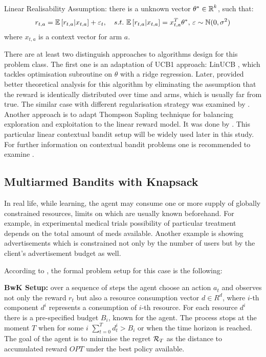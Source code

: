   \begin{definition}
      Linear Realisability Assumption: there is a unknown vector $\theta^* \in \operatorname{\mathbb{R}}^k$, such that: 
        \begin{equation*}
                r_{t,a} = \operatorname{\mathbb{E}}\left[r_{t,a}|x_{t,a}\right] + \varepsilon_t, \quad s.t. \,\operatorname{\mathbb{E}}\left[r_{t,a}|x_{t,a}\right] = x_{t,a}^T\theta^*,\, \varepsilon \sim \operatorname{\mathbb{N}}(0, \sigma^2)
        \end{equation*}  
        where $x_{t,a}$ is a context vector for arm $a$.
  \end{definition}
  There are at least two distinguish approaches to algorithms design for this problem class. The first one is an adaptation of UCB1 approach: LinUCB \cite{Li2010}, which tackles optimisation subroutine on $\theta$ with a ridge regression. Later, \cite{Abbasi-Yadkori2011} provided better theoretical analysis for this algorithm by eliminating the assumption that the reward is identically distributed over time and arms, which is usually far from true. The similar case with different regularisation strategy was examined by \cite{Auer2003}. Another approach is to adapt Thompson Sapling technique \cite{Li2011} for balancing exploration and exploitation to the linear reward model. It was done by \cite{Agrawal2013}. This particular linear contextual bandit setup will be widely used later in this study. For further information on contextual bandit problems one is recommended to examine \cite{Zhou2015}.
  
  \subsection{Multiarmed Bandits with Knapsack}
  In real life, while learning, the agent may consume one or more supply of globally constrained resources, limits on which are usually known beforehand. For example, in experimental medical trials possibility of particular treatment depends on the total amount of meds available. Another example is showing advertisements which is constrained not only by the number of users but by the client's advertisement budget as well. 
  
  According to \cite{Badanidiyuru2013}, the formal problem setup for this case is the following: 
  
  \begin{definition} \textbf{BwK Setup:} over a sequence of steps the agent choose an action $a_t$ and observes not only the reward $r_t$ but also a resource consumption vector $d \in R^d$, where $i$-th component $d^i$ represents a consumption of $i$-th resource. For each resource $d^i$ there is a pre-specified budget $B_i$, known for the agent. The process stops at the moment $T$ when for some $i$ $\sum_{t=0}^Td^i_t > B_i$ or when the time horizon is reached. The goal of the agent is to minimise the regret $\operatorname{\mathcal{R}}_T$ as the distance to accumulated reward $OPT$ under the best policy available.     
  \end{definition}


